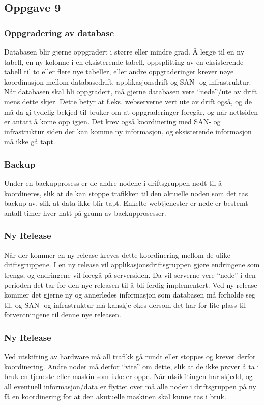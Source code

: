 \documentclass[a4paper, norsk, 12pt]{article}
\begin{document}
\subsection{Oppgave 9}
\subsubsection*{Oppgradering av database}
Databasen blir gjerne oppgradert i større eller mindre grad. Å legge til en ny tabell, en ny kolonne i en eksisterende tabell, oppsplitting av en eksisterende tabell til to eller flere nye tabeller, eller andre oppgraderinger krever nøye koordinasjon mellom databasedrift, applikasjonsdrift og SAN- og infrastruktur. Når databasen skal bli oppgradert, må gjerne databasen vere “nede”/ute av drift mens dette skjer. Dette betyr at f.eks. webserverne vert ute av drift også, og de må da gi tydelig bekjed til bruker om at oppgraderinger foregår, og når nettsiden er antatt å kome opp igjen. Det krev også koordinering med SAN- og infrastruktur siden der kan komme ny informasjon, og eksisterende informasjon må ikke gå tapt.

\subsubsection*{Backup}
Under en backupprosess er de andre nodene i driftsgruppen nødt til å koordineres, slik at de kan stoppe trafikken til den aktuelle noden som det tas backup av, slik at data ikke blir tapt. Enkelte webtjenester er nede er bestemt antall timer hver natt på grunn av backupprosesser.

\subsubsection*{Ny Release}
Når der kommer en ny release kreves dette koordinering mellom de ulike driftsgruppene. I en ny release vil applikasjonsdriftsgruppen gjøre endringene som trengs, og endringene vil foregå på serversiden. Da vil serverne vere “nede” i den perioden det tar for den nye releasen til å bli ferdig implementert. Ved ny release kommer det gjerne ny og annerledes informasjon som databasen må forholde seg til, og SAN- og infrastruktur må kanskje økes dersom det har for lite plass til forventningene til denne nye releasen.

\subsubsection*{Ny Release}
Ved utskifting av hardware må all trafikk gå rundt eller stoppes og krever derfor koordinering. Andre noder må derfor “vite” om dette, slik at de ikke prøver å ta i bruk en tjeneste eller maskin som ikke er oppe. Når utsikfitingen har skjedd, og all eventuell informasjon/data er flyttet over må alle noder i driftsgruppen på ny få en koordinering for at den akutuelle maskinen skal kunne tas i bruk.
\end{document}
